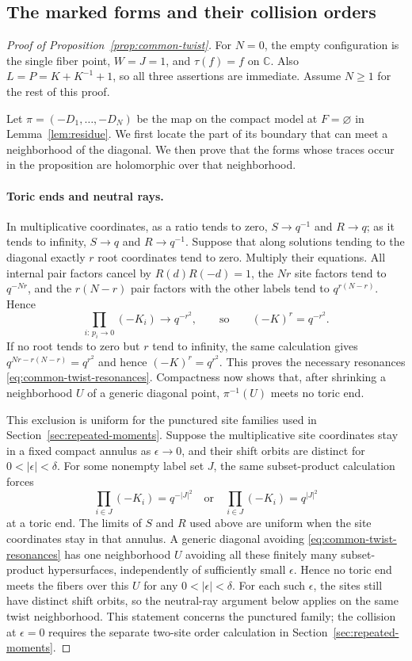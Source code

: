\subsection{The marked forms and their collision orders}

\begin{proof}[Proof of Proposition~\ref{prop:common-twist}]
For $N=0$, the empty configuration is the single fiber point,
$W=J=1$, and $\tau(f)=f$ on $\mathbb C$. Also
$L=P=K+K^{-1}+1$, so all three assertions are immediate. Assume
$N\ge1$ for the rest of this proof.

Let $\pi=(-D_1,\ldots,-D_N)$ be the map on the compact model at
$F=\varnothing$ in Lemma~\ref{lem:residue}. We first locate the part of its boundary that
can meet a neighborhood of the diagonal. We then prove that the forms
whose traces occur in the proposition are holomorphic over that
neighborhood.

\paragraph{Toric ends and neutral rays.}
In multiplicative coordinates, as a ratio tends to zero,
$S\to q^{-1}$ and $R\to q$; as it tends to infinity,
$S\to q$ and $R\to q^{-1}$. Suppose that along solutions tending to
the diagonal exactly $r$ root coordinates tend to zero. Multiply their
equations. All internal pair factors cancel by $R(d)R(-d)=1$,
the $Nr$ site factors tend to $q^{-Nr}$, and the $r(N-r)$ pair
factors with the other labels tend to $q^{r(N-r)}$. Hence
\[
 \prod_{i:\,p_i\to0}(-K_i)\longrightarrow q^{-r^2},
 \qquad\text{so}\qquad (-K)^r=q^{-r^2}.
\]
If no root tends to zero but $r$ tend to infinity, the same calculation
gives $q^{Nr-r(N-r)}=q^{r^2}$ and hence $(-K)^r=q^{r^2}$.
This proves the necessary resonances
\eqref{eq:common-twist-resonances}. Compactness now shows that, after
shrinking a neighborhood $U$ of a generic diagonal point, $\pi^{-1}(U)$
meets no toric end.

This exclusion is uniform for the punctured site families used in
Section~\ref{sec:repeated-moments}. Suppose the multiplicative site
coordinates stay in a fixed compact annulus as $\epsilon\to0$,
and their shift orbits are distinct for $0<|\epsilon|<\delta$.
For some nonempty label set $J$, the same subset-product calculation
forces
\[
 \prod_{i\in J}(-K_i)=q^{-|J|^2}
 \quad\text{or}\quad
 \prod_{i\in J}(-K_i)=q^{|J|^2}
\]
at a toric end. The limits of $S$ and $R$ used above are uniform
when the site coordinates stay in that annulus. A generic diagonal
avoiding \eqref{eq:common-twist-resonances} has one neighborhood
$U$ avoiding all these finitely many subset-product hypersurfaces,
independently of sufficiently small $\epsilon$. Hence no toric end
meets the fibers over this $U$ for any $0<|\epsilon|<\delta$.
For each such $\epsilon$, the sites still have distinct shift
orbits, so the neutral-ray argument below applies on the same
twist neighborhood. This statement concerns the punctured family;
the collision at $\epsilon=0$ requires the separate two-site order
calculation in Section~\ref{sec:repeated-moments}.


\end{proof}
